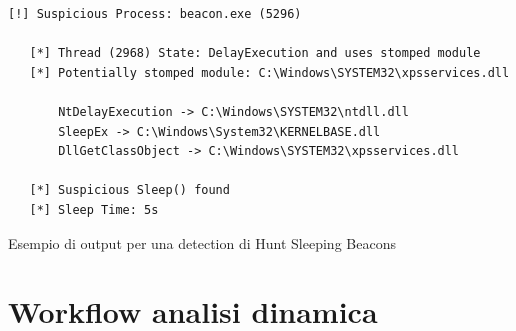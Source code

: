 \begin{code}
\begin{verbatim}
[!] Suspicious Process: beacon.exe (5296)

   [*] Thread (2968) State: DelayExecution and uses stomped module
   [*] Potentially stomped module: C:\Windows\SYSTEM32\xpsservices.dll

       NtDelayExecution -> C:\Windows\SYSTEM32\ntdll.dll
       SleepEx -> C:\Windows\System32\KERNELBASE.dll
       DllGetClassObject -> C:\Windows\SYSTEM32\xpsservices.dll

   [*] Suspicious Sleep() found
   [*] Sleep Time: 5s
\end{verbatim}
\label{lst:hunt-sleeping-beacons-example-text}
\caption{Esempio di output per una detection di Hunt Sleeping Beacons}
\end{code}

\section{Workflow analisi dinamica}
